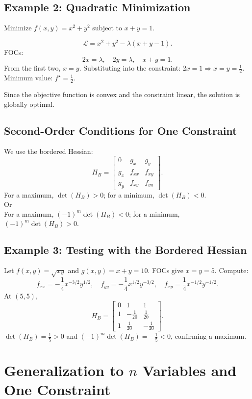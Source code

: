\documentclass[12pt]{article}
\newcommand{\Lag}{\mathcal{L}}
\begin{document}
\subsection*{Example 2: Quadratic Minimization}

Minimize \( f(x,y) = x^2 + y^2 \) subject to \( x + y = 1 \).

\[
\Lag = x^2 + y^2 - \lambda(x + y - 1).
\]
FOCs:
\[
2x = \lambda, \quad 2y = \lambda, \quad x + y = 1.
\]
From the first two, \( x = y \). Substituting into the constraint: \( 2x = 1 \Rightarrow x = y = \tfrac{1}{2} \). Minimum value: \( f^\star = \tfrac{1}{2} \).

Since the objective function is convex and the constraint linear, the solution is globally optimal.

\subsection*{Second-Order Conditions for One Constraint}

We use the bordered Hessian:
\[
H_B =
\begin{bmatrix}
0 & g_x & g_y\\
g_x & f_{xx} & f_{xy}\\
g_y & f_{xy} & f_{yy}
\end{bmatrix}.
\]
For a maximum, \( \det(H_B) > 0 \); for a minimum, \( \det(H_B) < 0 \).\\
Or\\
For a maximum, \( (-1)^{m}\det(H_B) < 0 \); for a minimum, \( (-1)^{m}\det(H_B) > 0 \).

\subsection*{Example 3: Testing with the Bordered Hessian}

Let \( f(x,y) = \sqrt{xy} \) and \( g(x,y) = x + y = 10 \). FOCs give \( x=y=5 \). Compute:
\[
f_{xx}=-\frac{1}{4}x^{-3/2}y^{1/2}, \quad f_{yy}=-\frac{1}{4}x^{1/2}y^{-3/2}, \quad f_{xy}=\frac{1}{4}x^{-1/2}y^{-1/2}.
\]
At \( (5,5) \),
\[
H_B =
\begin{bmatrix}
0 & 1 & 1\\
1 & -\frac{1}{20} & \frac{1}{20}\\
1 & \frac{1}{20} & -\frac{1}{20}
\end{bmatrix}.
\]
\( \det(H_B) = \frac{1}{5} > 0 \) and \( (-1)^{m}\det(H_B) =- \frac{1}{5} < 0 \),  confirming a maximum.

\section*{Generalization to $n$ Variables and One Constraint}
\end{document}
